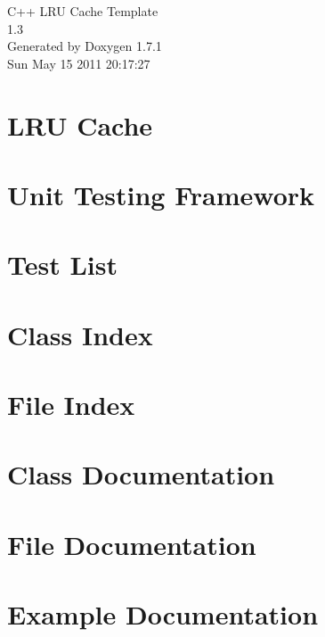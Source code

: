 \documentclass[letterpaper]{book}
\begin{document}
\begin{titlepage}
\vspace*{7cm}
\begin{center}
{\Large C++ LRU Cache Template \\[1ex]\large 1.3 }\\
\vspace*{1cm}
{\large Generated by Doxygen 1.7.1}\\
\vspace*{0.5cm}
{\small Sun May 15 2011 20:17:27}\\
\end{center}
\end{titlepage}
\clearemptydoublepage
{}
\tableofcontents
\clearemptydoublepage
{}
\chapter{LRU Cache}
\label{index}
\chapter{Unit Testing Framework}
\label{unittests01}

\chapter{Test List}
\label{test}

\chapter{Class Index}

\chapter{File Index}

\chapter{Class Documentation}

\chapter{File Documentation}






\chapter{Example Documentation}

\printindex
\end{document}

